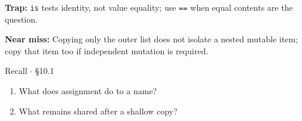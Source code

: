 \documentclass[11pt]{article}
\begin{document}
\begin{keepsection}
\begin{notebox}\textbf{Trap:} \texttt{is} tests identity, not value equality; use \texttt{==} when equal contents are the question.\end{notebox}

\begin{notebox}\textbf{Near miss:} Copying only the outer list does not isolate a nested mutable item; copy that item too if independent mutation is required.\end{notebox}

\begin{recallbox}{Recall \ensuremath{\cdot} §10.1}
\begin{enumerate}
\item What does assignment do to a name?
\item What remains shared after a shallow copy?
\end{enumerate}

\end{recallbox}
\end{keepsection}
\end{document}
